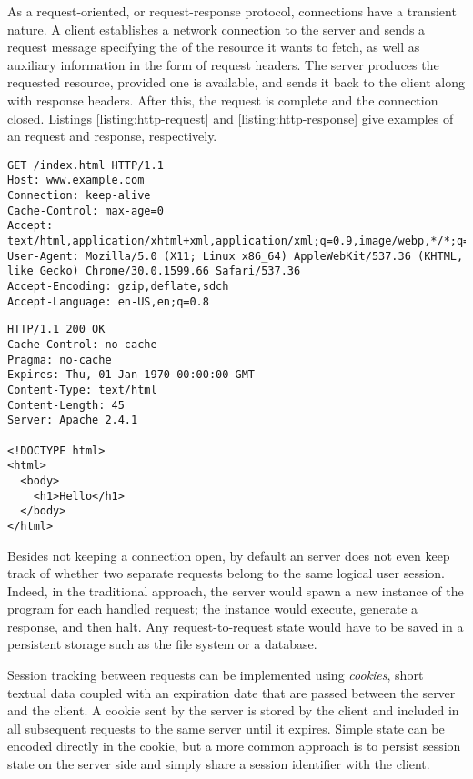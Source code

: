 As a request-oriented, or request-response protocol,  connections have a transient nature. A client establishes a network connection to the server and sends a request message specifying the  of the resource it wants to fetch, as well as auxiliary information in the form of request headers. The server produces the requested resource, provided one is available, and sends it back to the client along with response headers. After this, the request is complete and the connection closed. Listings \ref{listing:http-request} and \ref{listing:http-response} give examples of an  request and response, respectively. \cite{HTTP11}

\begin{code}
\begin{lstlisting}[breaklines,caption=A typical \ab{http} request.\label{listing:http-request}]
GET /index.html HTTP/1.1
Host: www.example.com
Connection: keep-alive
Cache-Control: max-age=0
Accept: text/html,application/xhtml+xml,application/xml;q=0.9,image/webp,*/*;q=0.8
User-Agent: Mozilla/5.0 (X11; Linux x86_64) AppleWebKit/537.36 (KHTML, like Gecko) Chrome/30.0.1599.66 Safari/537.36
Accept-Encoding: gzip,deflate,sdch
Accept-Language: en-US,en;q=0.8
\end{lstlisting}
\end{code}

\begin{code}
\begin{lstlisting}[breaklines,caption=A typical \ab{http} response.\label{listing:http-response}]
HTTP/1.1 200 OK
Cache-Control: no-cache
Pragma: no-cache
Expires: Thu, 01 Jan 1970 00:00:00 GMT
Content-Type: text/html
Content-Length: 45
Server: Apache 2.4.1

<!DOCTYPE html>
<html>
  <body>
    <h1>Hello</h1>
  </body>
</html>
\end{lstlisting}
\end{code}

Besides not keeping a connection open, by default an  server does not even keep track of whether two separate requests belong to the same logical user session. Indeed, in the traditional  approach, the server would spawn a new instance of the  program for each handled request; the instance would execute, generate a response, and then halt. Any request-to-request state would have to be saved in a persistent storage such as the file system or a database.

Session tracking between requests can be implemented using \emph{cookies}, short textual data coupled with an expiration date that are passed between the server and the client. A cookie sent by the server is stored by the client and included in all subsequent requests to the same server until it expires. Simple state can be encoded directly in the cookie, but a more common approach is to persist session state on the server side and simply share a session identifier with the client. \cite{HTTPState}

